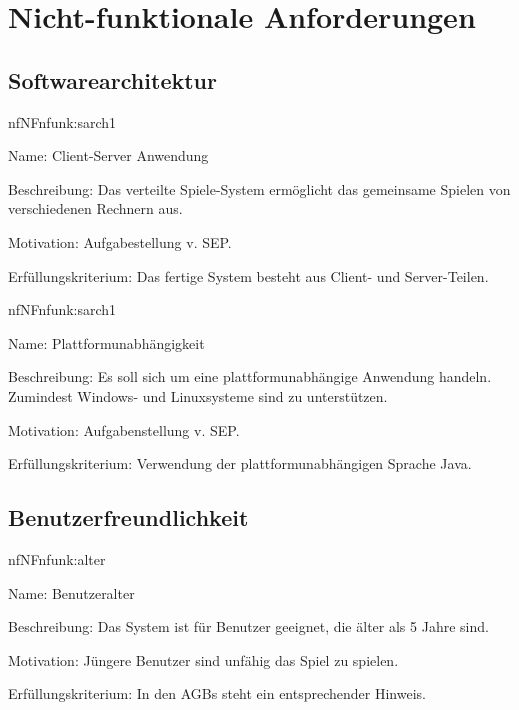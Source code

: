 \chapter{Nicht-funktionale Anforderungen}

\setcounter{nf}{10}

\section{Softwarearchitektur}

\begin{description}[leftmargin=5em, style=sameline]	
	\begin{lhp}{nf}{NF}{nfunk:sarch1}
		\item [Name:] Client-Server Anwendung
		\item [Beschreibung:] Das verteilte Spiele-System ermöglicht das gemeinsame Spielen von verschiedenen Rechnern aus.
		\item [Motivation:] Aufgabestellung v. SEP.
		\item [Erfüllungskriterium:] Das fertige System besteht aus Client- und Server-Teilen.
	\end{lhp}
	
	\begin{lhp}{nf}{NF}{nfunk:sarch1}
		\item [Name:] Plattformunabhängigkeit
		\item [Beschreibung:] Es soll sich um eine plattformunabhängige Anwendung handeln. Zumindest Windows- und Linuxsysteme sind zu unterstützen.
		\item [Motivation:] Aufgabenstellung v. SEP.
		\item [Erfüllungskriterium:] Verwendung der plattformunabhängigen Sprache Java.
	\end{lhp}
\end{description}



\section{Benutzerfreundlichkeit}


\begin{description}[leftmargin=5em, style=sameline]	
	\begin{lhp}{nf}{NF}{nfunk:alter}
		\item [Name:] Benutzeralter
		\item [Beschreibung:] Das System ist für Benutzer geeignet, die älter als 5 Jahre sind.
		\item [Motivation:] Jüngere Benutzer sind unfähig das Spiel zu spielen.
		\item [Erfüllungskriterium:] In den AGBs steht ein entsprechender Hinweis.
	\end{lhp}
\end{description}

